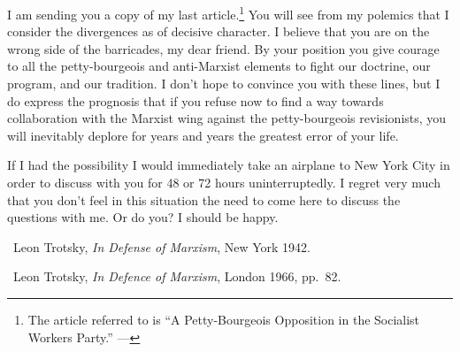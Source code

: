 \label{1939-12-20_a-letter-to-max-shachtman}


I am sending you a copy of my last article.\footnote{The article referred to is ``A Petty-Bourgeois Opposition in the Socialist Workers Party.'' ---\ed} You will see from my polemics that I consider the divergences as of decisive character. I believe that you are on the wrong side of the barricades, my dear friend. By your position you give courage to all the petty-bourgeois and anti-Marxist elements to fight our doctrine, our program, and our tradition. I don’t hope to convince you with these lines, but I do express the prognosis that if you refuse now to find a way towards collaboration with the Marxist wing against the petty-bourgeois revisionists, you will inevitably deplore for years and years the greatest error of your life.

If I had the possibility I would immediately take an airplane to New York City in order to discuss with you for 48 or 72 hours uninterruptedly. I regret very much that you don’t feel in this situation the need to come here to discuss the questions with me. Or do you? I should be happy.


\begin{letterinfo}
	\firstpublished\ Leon Trotsky, \emph{In Defense of Marxism}, New York 1942.
	
	\checkedagainst\ Leon Trotsky, \emph{In Defence of Marxism}, London 1966, pp.~82.
\end{letterinfo}